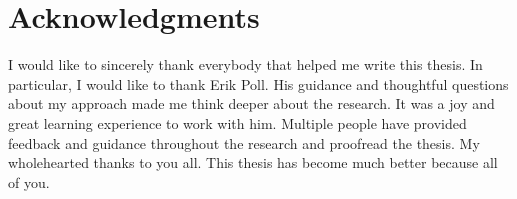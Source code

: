 \section*{Acknowledgments}\label{chapter:acknowledgments}
I would like to sincerely thank everybody that helped me write this thesis. In particular, I would like to thank Erik Poll. His guidance and thoughtful questions about my approach made me think deeper about the research. It was a joy and great learning experience to work with him. Multiple people have provided feedback and guidance throughout the research and proofread the thesis. My wholehearted thanks to you all. This thesis has become much better because all of you.

